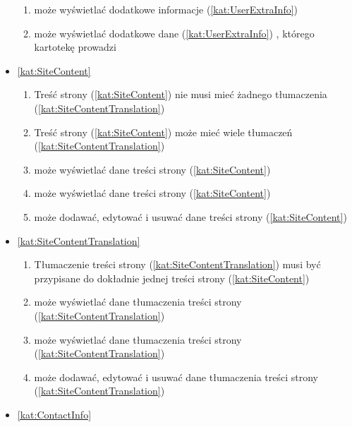 \begin{itemize}[label={\textbf{Reguły dla}}, wide, labelwidth=!, labelindent=0pt]
\begin{enumerate}[label={\textbf{REG/\protect\threedigits{\arabic{enumi}}}}, wide, labelwidth=!, align=left, leftmargin=3cm, resume]
        \item {} może wyświetlać dodatkowe informacje (\ref{kat:UserExtraInfo}) 
        \item {} może wyświetlać dodatkowe dane (\ref{kat:UserExtraInfo}) , którego kartotekę prowadzi
    \end{enumerate}
    \item\ref{kat:SiteContent}
    \begin{enumerate}[label={\textbf{REG/\protect\threedigits{\arabic{enumi}}}}, wide, labelwidth=!, align=left, leftmargin=3cm, resume]
        \item Treść strony (\ref{kat:SiteContent}) nie musi mieć żadnego tłumaczenia (\ref{kat:SiteContentTranslation})
        \item Treść strony (\ref{kat:SiteContent}) może mieć wiele tłumaczeń (\ref{kat:SiteContentTranslation})
        \item {} może wyświetlać dane treści strony (\ref{kat:SiteContent})
        \item {} może wyświetlać dane treści strony (\ref{kat:SiteContent})
        \item {} może dodawać, edytować i usuwać dane treści strony (\ref{kat:SiteContent})
    \end{enumerate}
    \item\ref{kat:SiteContentTranslation}
    \begin{enumerate}[label={\textbf{REG/\protect\threedigits{\arabic{enumi}}}}, wide, labelwidth=!, align=left, leftmargin=3cm, resume]
        \item Tłumaczenie treści strony (\ref{kat:SiteContentTranslation}) musi być przypisane do dokładnie jednej treści strony (\ref{kat:SiteContent})
        \item {} może wyświetlać dane tłumaczenia treści strony (\ref{kat:SiteContentTranslation})
        \item {} może wyświetlać dane tłumaczenia treści strony (\ref{kat:SiteContentTranslation})
        \item {} może dodawać, edytować i usuwać dane tłumaczenia treści strony (\ref{kat:SiteContentTranslation})
    \end{enumerate}
    \item\ref{kat:ContactInfo}
    \begin{enumerate}[label={\textbf{REG/\protect\threedigits{\arabic{enumi}}}}, wide, labelwidth=!, align=left, leftmargin=3cm, resume]

\end{enumerate}
\end{itemize}
